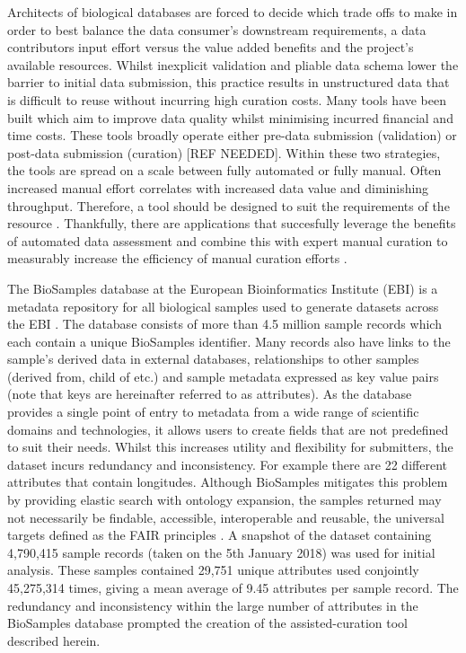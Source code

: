 \documentclass{bmcart}
\begin{document}
Architects of biological databases are forced to decide which trade offs to make in order to best balance the data consumer's downstream requirements, a data contributors input effort versus the value added benefits and the project's available resources. Whilst inexplicit validation and pliable data schema lower the barrier to initial data submission, this practice results in unstructured data that is difficult to reuse without incurring high curation costs. Many tools have been built which aim to improve data quality whilst minimising incurred financial and time costs. These tools broadly operate either pre-data submission (validation) or post-data submission (curation) [REF NEEDED]. Within these two strategies, the tools are spread on a scale between fully automated or fully manual. Often increased manual effort correlates with increased data value and diminishing throughput. Therefore, a tool should be designed to suit the requirements of the resource \cite{goble2008data}. Thankfully, there are applications that succesfully leverage the benefits of automated data assessment and combine this with expert manual curation to measurably increase the efficiency of manual curation efforts \cite{salgado2012myminer, salimi2006biocurator, szostak2015construction}.

The BioSamples database at the European Bioinformatics Institute (EBI) is a metadata repository for all biological samples used to generate datasets across the EBI \cite{gostev2011biosample, faulconbridge2013updates}. The database consists of more than 4.5 million sample records which each contain a unique BioSamples identifier. Many records also have links to the sample's derived data in external databases, relationships to other samples (derived from, child of etc.) and sample metadata expressed as key value pairs (note that keys are hereinafter referred to as attributes). As the database provides a single point of entry to metadata from a wide range of scientific domains and technologies, it allows users to create fields that are not predefined to suit their needs. Whilst this increases utility and flexibility for submitters, the dataset incurs redundancy and inconsistency. For example there are 22 different attributes that contain longitudes. Although BioSamples mitigates this problem by providing elastic search with ontology expansion, the samples returned may not necessarily be findable, accessible, interoperable and reusable, the universal targets defined as the FAIR principles \cite{wilkinson2016fair}. A snapshot of the dataset containing 4,790,415 sample records (taken on the 5th January 2018) was used for initial analysis. These samples contained 29,751 unique attributes used conjointly 45,275,314 times, giving a mean average of 9.45 attributes per sample record. The redundancy and inconsistency within the large number of attributes in the BioSamples database prompted the creation of the assisted-curation tool described herein.
\end{document}
